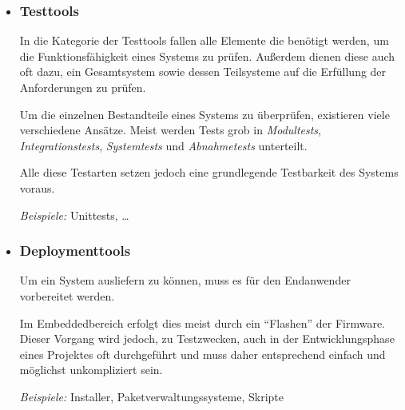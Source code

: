 \begin{itemize}
  Der Entwickler ist durch das Setzen von Breakpoints\footnote{Willkürliche,
  vom Entwickler vor dem Start der Software zu setzende, "`Haltepunkte"' im
  Programmablauf.} mittels des Debuggers in der Lage, eine Software in einen
  definierten Zustand zu bringen. Anschließend kann er den weiteren
  Programmablauf schrittweise ausführen lassen (single-stepping) oder mitunter
  auch geringfügige Änderung am Speicher des Systems vornehmen.
  
  Debugger sind in integrierten Systemen oft auf eine hohe Hardwareunterstützung
  angewiesen. In \autoref{subs:hwdebugger} wird dies näher beschrieben.
  
   \emph{Beispiele:} \gls{gdb} , IDB (Intel Debugger), Valgrind
  \item \subsubsection*{Testtools} In die Kategorie der Testtools fallen
  alle Elemente die benötigt werden, um die Funktionsfähigkeit eines Systems zu
  prüfen. Außerdem dienen diese auch oft dazu, ein Gesamtsystem sowie dessen
  Teilsysteme auf die Erfüllung der Anforderungen zu prüfen.
  
  Um die einzelnen Bestandteile eines Systems zu überprüfen, existieren viele
  verschiedene Ansätze. Meist werden Tests grob in \emph{Modultests},
  \emph{Integrationstests}, \emph{Systemtests} und \emph{Abnahmetests}
  unterteilt.
  
  Alle diese Testarten setzen jedoch eine grundlegende Testbarkeit des Systems
  voraus.
  
  \emph{Beispiele:} Unittests, \ldots  
  \item \subsubsection*{Deploymenttools}\label{subs:deployment} Um ein System
  ausliefern zu können, muss es für den Endanwender vorbereitet werden.
  
  Im Embeddedbereich erfolgt dies meist durch ein "`Flashen"' der Firmware.
  Dieser Vorgang wird jedoch, zu Testzwecken, auch in der Entwicklungsphase
  eines Projektes oft durchgeführt und muss daher entsprechend einfach und
  möglichst unkompliziert sein.
  
  \emph{Beispiele:} Installer, Paketverwaltungssysteme, Skripte
\end{itemize}

